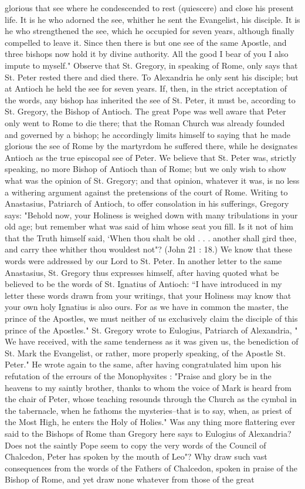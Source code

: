 glorious that see where he condescended to rest (quiescere) and close his present life. It is he who adorned the see, whither he sent the Evangelist, his disciple. It is he who strengthened the see, which he occupied for seven years, although finally compelled to leave it. Since then there is but one see of the same Apostle, and three bishops now hold it by divine authority. All the good I bear of you I also impute to myself." Observe that St. Gregory, in speaking of Rome, only says that St. Peter rested there and died there. To Alexandria he only sent his disciple; but at Antioch he held the see for seven years. If, then, in the strict acceptation of the words, any bishop has inherited the see of St. Peter, it must be, according to St. Gregory, the Bishop of Antioch. The great Pope was well aware that Peter only went to Rome to die there; that the Roman Church was already founded and governed by a bishop; he accordingly limits himself to saying that he made glorious the see of Rome by the martyrdom he suffered there, while he designates Antioch as the true episcopal see of Peter. We believe that St. Peter was, strictly speaking, no more Bishop of Antioch than of Rome; but we only wish to show what was the opinion of St. Gregory; and that opinion, whatever it was, is no less a withering argument against the pretensions of the court of Rome. Writing to Anastasius, Patriarch of Antioch, to offer consolation in his sufferings, Gregory says: "Behold now, your Holiness is weighed down with many tribulations in your old age; but remember what was said of him whose seat you fill. Is it not of him that the Truth himself said, ‘When thou shalt be old . . . another shall gird thee, and carry thee whither thou wouldest not"? (John 21 : 18.) We know that these words were addressed by our Lord to St. Peter. In another letter to the same Anastasius, St. Gregory thus expresses himself, after having quoted what be believed to be the words of St. Ignatius of Antioch: “I have introduced in my letter these words drawn from your writings, that your Holiness may know that your own holy Ignatius is also ours. For as we have in common the master, the prince of the Apostles, we must neither of us exclusively claim the disciple of this prince of the Apostles." St. Gregory wrote to Eulogius, Patriarch of Alexandria, " We have received, with the same tenderness as it was given us, the benediction of St. Mark the Evangelist, or rather, more properly speaking, of the Apostle St. Peter." He wrote again to the same, after having congratulated him upon his refutation of the errours of the Monophysites : "Praise and glory be in the heavens to my saintly brother, thanks to whom the voice of Mark is heard from the chair of Peter, whose teaching resounds through the Church as the cymbal in the tabernacle, when he fathoms the mysteries--that is to say, when, as priest of the Most High, he enters the Holy of Holies." Was any thing more flattering ever said to the Bishops of Rome than Gregory here says to Eulogius of Alexandria? Does not the saintly Pope seem to copy the very words of the Council of Chalcedon, Peter has spoken by the mouth of Leo"? Why draw such vast consequences from the words of the Fathers of Chalcedon, spoken in praise of the Bishop of Rome, and yet draw none whatever from those of the great 
